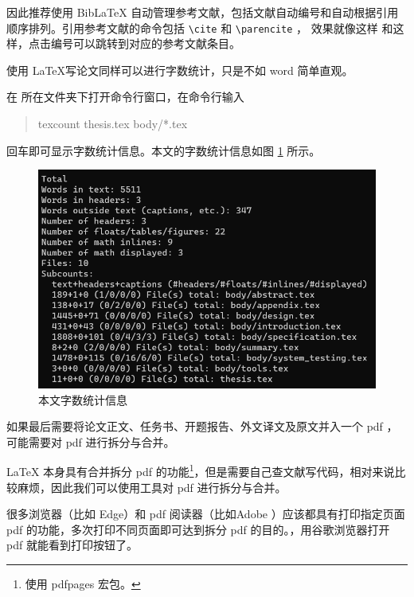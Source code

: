 因此推荐使用 BibLaTeX 自动管理参考文献，包括文献自动编号和自动根据引用顺序排列。引用参考文献的命令包括 \verb!\cite! 和 \verb!\parencite! ， 效果就像这样 \cite{sample} 和这样\parencite{sample}，点击编号可以跳转到对应的参考文献条目。


使用 \LaTeX 写论文同样可以进行字数统计，只是不如 word 简单直观。

在  所在文件夹下打开命令行窗口，在命令行输入 

\begin{quote}
texcount thesis.tex body/*.tex
\end{quote}

回车即可显示字数统计信息。本文的字数统计信息如图 \ref{fig:specification:texcount} 所示。

\begin{figure}[htbp]  %
  \centering  %
  \includegraphics[scale=.5]{figure/texcount.png}  %
  \caption{本文字数统计信息}  %
  \label{fig:specification:texcount}  %
\end{figure}

如果最后需要将论文正文、任务书、开题报告、外文译文及原文并入一个 pdf ，可能需要对 pdf 进行拆分与合并。

\LaTeX{} 本身具有合并拆分 pdf 的功能\footnote{使用 pdfpages 宏包。}，但是需要自己查文献写代码，相对来说比较麻烦，因此我们可以使用工具对 pdf 进行拆分与合并。

很多浏览器（比如 Edge）和 pdf 阅读器（比如Adobe ）应该都具有打印指定页面 pdf 的功能，多次打印不同页面即可达到拆分 pdf 的目的。，用谷歌浏览器打开 pdf 就能看到打印按钮了。

